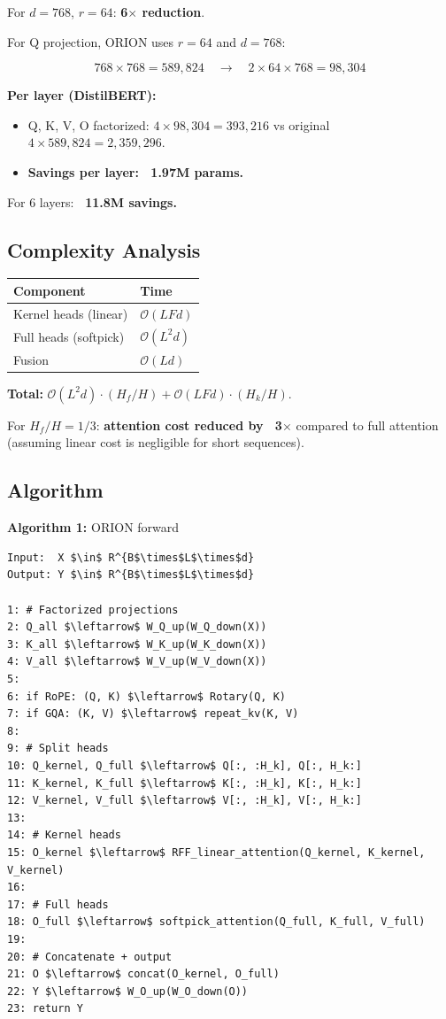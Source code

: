 For $d = 768$, $r = 64$: \textbf{6$\times$ reduction}.

For Q projection, ORION uses $r = 64$ and $d = 768$:

\[
768 \times 768 = 589,824 \quad \rightarrow \quad 2 \times 64 \times 768 = 98,304
\]

\textbf{Per layer (DistilBERT):}
\begin{itemize}
\item Q, K, V, O factorized: $4 \times 98,304 = 393,216$ vs original $4 \times 589,824 = 2,359,296$.
\item \textbf{Savings per layer: ~1.97M params.}

\end{itemize}
For 6 layers: \textbf{~11.8M savings.}

\subsection{Complexity Analysis}

\begin{table}[H]
\centering
\small
\begin{tabular}{ll}
\toprule
\textbf{Component} & \textbf{Time} \\
\midrule
Kernel heads (linear) & $\mathcal{O}(L F d)$ \\
Full heads (softpick) & $\mathcal{O}(L^2 d)$ \\
Fusion & $\mathcal{O}(L d)$ \\
\bottomrule
\end{tabular}
\end{table}

\textbf{Total:} $\mathcal{O}(L^2 d) \cdot (H_f / H) + \mathcal{O}(L F d) \cdot (H_k / H)$.

For $H_f / H = 1/3$: \textbf{attention cost reduced by ~3$\times$} compared to full 
attention (assuming linear cost is negligible for short sequences).

\subsection{Algorithm}

\textbf{Algorithm 1:} ORION forward
\begin{lstlisting}
Input:  X $\in$ R^{B$\times$L$\times$d}
Output: Y $\in$ R^{B$\times$L$\times$d}

1: # Factorized projections
2: Q_all $\leftarrow$ W_Q_up(W_Q_down(X))
3: K_all $\leftarrow$ W_K_up(W_K_down(X))
4: V_all $\leftarrow$ W_V_up(W_V_down(X))
5:
6: if RoPE: (Q, K) $\leftarrow$ Rotary(Q, K)
7: if GQA: (K, V) $\leftarrow$ repeat_kv(K, V)
8:
9: # Split heads
10: Q_kernel, Q_full $\leftarrow$ Q[:, :H_k], Q[:, H_k:]
11: K_kernel, K_full $\leftarrow$ K[:, :H_k], K[:, H_k:]
12: V_kernel, V_full $\leftarrow$ V[:, :H_k], V[:, H_k:]
13:
14: # Kernel heads
15: O_kernel $\leftarrow$ RFF_linear_attention(Q_kernel, K_kernel, V_kernel)
16:
17: # Full heads
18: O_full $\leftarrow$ softpick_attention(Q_full, K_full, V_full)
19:
20: # Concatenate + output
21: O $\leftarrow$ concat(O_kernel, O_full)
22: Y $\leftarrow$ W_O_up(W_O_down(O))
23: return Y
\end{lstlisting}

